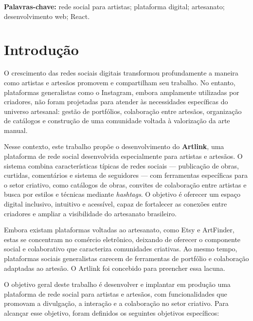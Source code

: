 \documentclass[a4paper, 12pt, oneside]{article}
\begin{document}
\noindent \textbf{Palavras-chave:} rede social para artistas; plataforma digital; artesanato; desenvolvimento web; React.


\section{Introdução}

O crescimento das redes sociais digitais transformou profundamente a maneira como artistas e artesãos promovem e compartilham seu trabalho. No entanto, plataformas generalistas como o Instagram, embora amplamente utilizadas por criadores, não foram projetadas para atender às necessidades específicas do universo artesanal: gestão de portfólios, colaboração entre artesãos, organização de catálogos e construção de uma comunidade voltada à valorização da arte manual.

Nesse contexto, este trabalho propõe o desenvolvimento do \textbf{Artlink}, uma plataforma de rede social desenvolvida especialmente para artistas e artesãos. O sistema combina características típicas de redes sociais --- publicação de obras, curtidas, comentários e sistema de seguidores --- com ferramentas específicas para o setor criativo, como catálogos de obras, convites de colaboração entre artistas e busca por estilos e técnicas mediante \textit{hashtags}. O objetivo é oferecer um espaço digital inclusivo, intuitivo e acessível, capaz de fortalecer as conexões entre criadores e ampliar a visibilidade do artesanato brasileiro.

Embora existam plataformas voltadas ao artesanato, como Etsy e ArtFinder, estas se concentram no comércio eletrônico, deixando de oferecer o componente social e colaborativo que caracteriza comunidades criativas. Ao mesmo tempo, plataformas sociais generalistas carecem de ferramentas de portfólio e colaboração adaptadas ao artesão. O Artlink foi concebido para preencher essa lacuna.

O objetivo geral deste trabalho é desenvolver e implantar em produção uma plataforma de rede social para artistas e artesãos, com funcionalidades que promovam a divulgação, a interação e a colaboração no setor criativo. Para alcançar esse objetivo, foram definidos os seguintes objetivos específicos:
\end{document}
